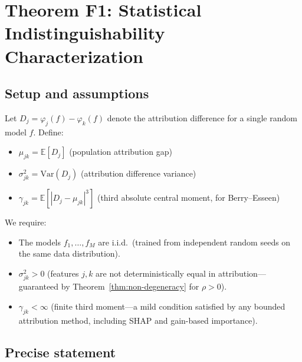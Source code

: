 \documentclass{article}
\newcommand{\Var}{\mathrm{Var}}
\begin{document}
\section{Theorem F1: Statistical Indistinguishability Characterization}

\subsection{Setup and assumptions}

Let $D_j = \varphi_j(f) - \varphi_k(f)$ denote the attribution
difference for a single random model $f$. Define:
\begin{itemize}
    \item $\mu_{jk} = \mathbb{E}[D_j]$ (population attribution gap)
    \item $\sigma_{jk}^2 = \Var(D_j)$ (attribution difference variance)
    \item $\gamma_{jk} = \mathbb{E}[|D_j - \mu_{jk}|^3]$ (third absolute
      central moment, for Berry--Esseen)
\end{itemize}

We require:
\begin{itemize}
    \item[\textbf{(A1)}] The models $f_1, \ldots, f_M$ are i.i.d.\
      (trained from independent random seeds on the same data distribution).
    \item[\textbf{(A2)}] $\sigma_{jk}^2 > 0$ (features $j, k$ are not
      deterministically equal in attribution---guaranteed by
      Theorem~\ref{thm:non-degeneracy} for $\rho > 0$).
    \item[\textbf{(A3)}] $\gamma_{jk} < \infty$ (finite third moment---a
      mild condition satisfied by any bounded attribution method, including
      SHAP and gain-based importance).
\end{itemize}

\subsection{Precise statement}
\end{document}
